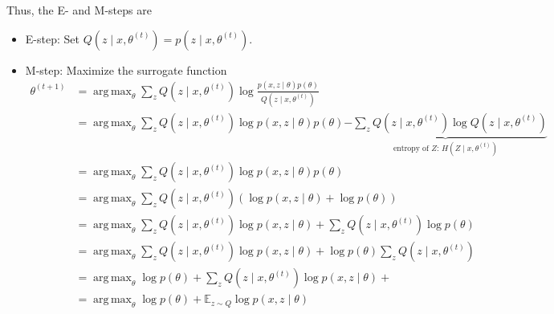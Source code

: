 \documentclass[11pt]{article}
\theoremstyle{definition}
\DeclareMathOperator*{\argmax}{arg\,max}
\begin{document}
Thus, the E- and M-steps are
\begin{itemize}
    \item E-step: Set $Q(z \mid x, \theta^{(t)}) = p(z \mid x, \theta^{(t)})$.
    \item M-step: Maximize the surrogate function
    $$
    \begin{aligned}
    \theta^{(t+1)}
    &= \argmax_\theta \sum_z Q(z \mid x, \theta^{(t)}) \log \frac{p(x, z \mid \theta) p(\theta)}{Q(z \mid x, \theta^{(t)})} \\
    &= \argmax_\theta \sum_z Q(z \mid x, \theta^{(t)}) \log p(x, z \mid \theta) p(\theta) \underbrace{- \sum_z Q(z \mid x, \theta^{(t)}) \log Q(z \mid x, \theta^{(t)})}_{\text{entropy of } Z: \, H(Z \mid x, \theta^{(t)})} \\
    &= \argmax_\theta \sum_z Q(z \mid x, \theta^{(t)}) \log p(x, z \mid \theta) p(\theta) \\
    &= \argmax_\theta \sum_z Q(z \mid x, \theta^{(t)}) \left(\log p(x, z \mid \theta) + \log p(\theta) \right) \\
    &= \argmax_\theta \sum_z Q(z \mid x, \theta^{(t)}) \log p(x, z \mid \theta) + \sum_z Q(z \mid x, \theta^{(t)}) \log p(\theta) \\
    &= \argmax_\theta \sum_z Q(z \mid x, \theta^{(t)}) \log p(x, z \mid \theta) + \log p(\theta) \sum_z Q(z \mid x, \theta^{(t)}) \\
    &= \argmax_\theta \log p(\theta) + \sum_z Q(z \mid x, \theta^{(t)}) \log p(x, z \mid \theta) + \\
    &= \argmax_\theta \log p(\theta) + \mathbb{E}_{z \sim Q} \log p(x, z \mid \theta)
    \end{aligned}
    $$
\end{itemize}
\end{document}
